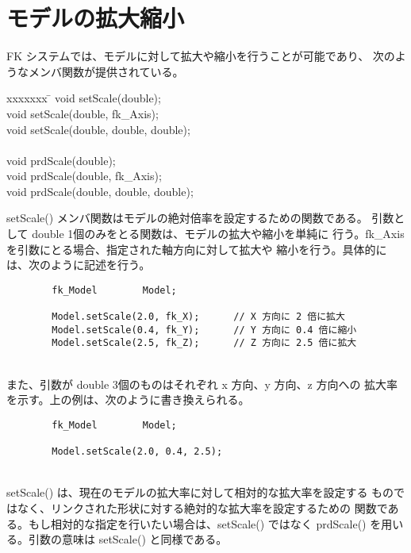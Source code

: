 \section{モデルの拡大縮小}
FK システムでは、モデルに対して拡大や縮小を行うことが可能であり、
次のようなメンバ関数が提供されている。
\begin{bf}
\begin{tabbing}
xxxxxxx \= \kill
\> void setScale(double); \\
\> void setScale(double, fk\_Axis); \\
\> void setScale(double, double, double); \\
\\
\> void prdScale(double); \\
\> void prdScale(double, fk\_Axis); \\
\> void prdScale(double, double, double); \\
\end{tabbing}
\end{bf}
setScale() メンバ関数はモデルの絶対倍率を設定するための関数である。
引数として double 1個のみをとる関数は、モデルの拡大や縮小を単純に
行う。fk\_Axis を引数にとる場合、指定された軸方向に対して拡大や
縮小を行う。具体的には、次のように記述を行う。
\\
\begin{breakbox}
\begin{verbatim}
        fk_Model        Model;

        Model.setScale(2.0, fk_X);      // X 方向に 2 倍に拡大
        Model.setScale(0.4, fk_Y);      // Y 方向に 0.4 倍に縮小
        Model.setScale(2.5, fk_Z);      // Z 方向に 2.5 倍に拡大
\end{verbatim}
\end{breakbox}
~ \\
また、引数が double 3個のものはそれぞれ x 方向、y 方向、z 方向への
拡大率を示す。上の例は、次のように書き換えられる。
\\
\begin{screen}
\begin{verbatim}
        fk_Model        Model;

        Model.setScale(2.0, 0.4, 2.5);
\end{verbatim}
\end{screen}
~ \\
setScale() は、現在のモデルの拡大率に対して相対的な拡大率を設定する
ものではなく、リンクされた形状に対する絶対的な拡大率を設定するための
関数である。もし相対的な指定を行いたい場合は、setScale() ではなく
prdScale() を用いる。引数の意味は setScale() と同様である。

